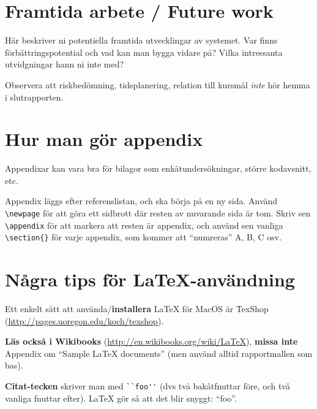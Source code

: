 \documentclass[a4paper,12pt]{article}
\begin{document}
\section{Framtida arbete / Future work}
Här beskriver ni potentiella framtida utvecklingar av systemet. Var finns förbättrings\-poten\-tial och vad kan man bygga vidare på? Vilka intressanta utvidgningar hann ni inte med?

Observera att risk\-be\-döm\-ning, tids\-planering, relation till kursmål \emph{inte} hör hemma i slutrapporten.
\newpage

%



\newpage
\appendix %
\section{Hur man gör appendix}
Appendixar kan vara bra för bilagor som enkätundersökningar, större kodavsnitt, etc.

Appendix läggs efter referenslistan, och ska börja på en ny sida. Använd \verb|\newpage| för att göra ett sidbrott där resten av nuvarande sida är tom. Skriv sen \verb|\appendix| för att markera att resten är appendix, och
 använd sen vanliga \verb|\section{}| för varje appendix, som kommer att ``numreras'' A, B, C osv.

\section{Några tips för La\TeX-användning}

Ett enkelt sätt att använda/\textbf{installera} LaTeX för MacOS är TexShop (\url{http://pages.uoregon.edu/koch/texshop}).

\textbf{Läs också i Wikibooks} (\url{http://en.wikibooks.org/wiki/LaTeX}), \textbf{missa inte} Appendix om ``Sample LaTeX documents'' (men använd alltid rapportmallen som bas).

\textbf{Citat-tecken} skriver man med \verb|``foo''| (dvs två bakåtfnuttar före, och två vanliga fnuttar efter). LaTeX gör så att det blir snyggt: ``foo''.
\end{document}
